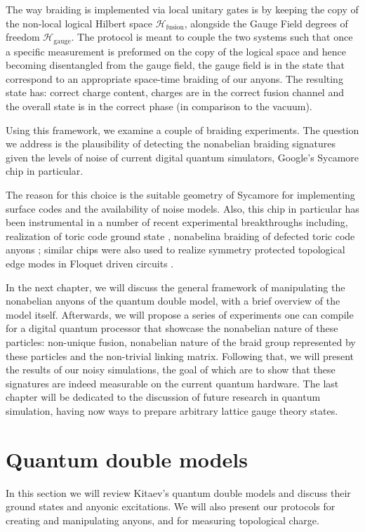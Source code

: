 \documentclass[two column]{article}
\begin{document}
The way braiding is implemented via local unitary gates is by keeping the copy of the non-local logical Hilbert space $\mathcal{H}_{\text{fusion}}$, alongside the Gauge Field degrees of freedom $\mathcal{H}_{\text{gauge}}$. The protocol is meant to couple the two systems such that once a specific measurement is preformed on the copy of the logical space and hence becoming disentangled from the gauge field, the gauge field is in the state that correspond to an appropriate space-time braiding of our anyons. The resulting state has: correct charge content, charges are in the correct fusion channel and the overall state is in the correct phase (in comparison to the vacuum).

Using this framework, we examine a couple of braiding experiments. The question we address is the plausibility of detecting the nonabelian braiding signatures given the levels of noise of current digital quantum simulators, Google's Sycamore chip in particular.

The reason for this choice is the suitable geometry of Sycamore for implementing surface codes and the availability of noise models. Also, this chip in particular has been instrumental in a number of recent experimental breakthroughs including, realization of toric code ground state \cite{}, nonabelina braiding of defected toric code anyons \cite{}; similar chips were also used to realize symmetry protected topological edge modes in Floquet driven circuits \cite{}.

In the next chapter, we will discuss the general framework of manipulating the nonabelian anyons of the quantum double model, with a brief overview of the model itself. Afterwards, we will propose a series of experiments one can compile for a digital quantum processor that showcase the nonabelian nature of these particles: non-unique fusion, nonabelian nature of the braid group represented by these particles and the non-trivial linking matrix. Following that, we will present the results of our noisy simulations, the goal of which are to show that these signatures are indeed measurable on the current quantum hardware. The last chapter will be dedicated to the discussion of future research in quantum simulation, having now ways to prepare arbitrary lattice gauge theory states.

\section{Quantum double models}

In this section we will review Kitaev's quantum double models\cite{Kitaev_2003} and discuss their ground states and anyonic excitations. We will also present our protocols for creating and manipulating anyons, and for measuring topological charge. 
\end{document}
